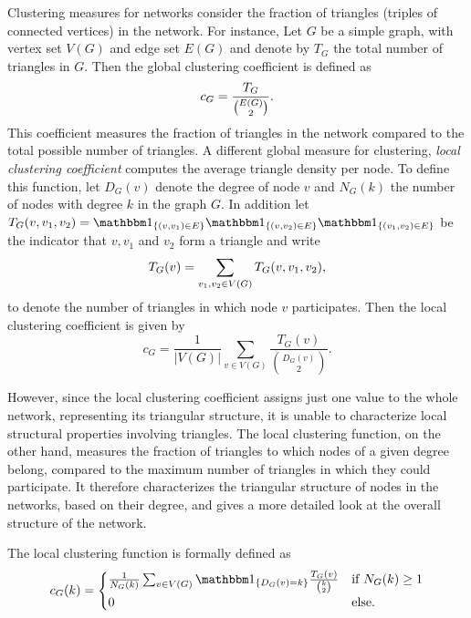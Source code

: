 Clustering measures for networks consider the fraction of triangles (triples of connected vertices) in the network. 
For instance, Let $G$ be a simple graph, with vertex set $V(G)$ and edge set $E(G)$ and denote by $T_G$ the total number of triangles in $G$. Then the global clustering coefficient is defined as
\[
	c_G = \frac{T_G}{\binom{E(G)}{2}}.
\]
This coefficient measures the fraction of triangles in the network compared to the total possible number of triangles. A different global measure for clustering, \emph{local clustering coefficient} computes the average triangle density per node. To define this function, let $D_G(v)$ denote the degree of node $v$ and $N_G(k)$ the number of nodes with degree $k$ in the graph $G$. In addition let $\T_G(v,v_1,v_2) = \ind{(v,v_1) \in E} \ind{(v, v_2) \in E} \ind{(v_1, v_2) \in E}$ be the indicator that $v, v_1$ and $v_2$ form a triangle and write
\begin{equation}
	T_G(v) = \sum_{v_1, v_2 \in V(G)} T_G(v,v_1,v_2),
\end{equation}
to denote the number of triangles in which node $v$ participates. Then the local clustering coefficient is given by
\[
	c_G = \frac{1}{|V(G)|} \sum_{v \in V(G)} \frac{T_G(v)}{\binom{D_G(v)}{2}}.
\]

However, since the local clustering coefficient assigns just one value to the whole network, representing its triangular structure, it is unable to characterize local structural properties involving triangles. The local clustering function, on the other hand, measures the fraction of triangles to which nodes of a given degree belong, compared to the maximum number of triangles in which they could participate. It therefore characterizes the triangular structure of nodes in the networks, based on their degree, and gives a more detailed look at the overall structure of the network.

The local clustering function is formally defined as
\begin{equation}\label{eq:def_local_clustering_general}
	c_{G}(k) = \begin{cases}
		\frac{1}{N_G(k)} \sum_{v \in V(G)}  \ind{D_G(v) = k} \frac{\T_G(v)}{\binom{k}{2}} &\mbox{if } N_G(k) \ge 1\\
		0 &\mbox{else.}
	\end{cases}
\end{equation} 

